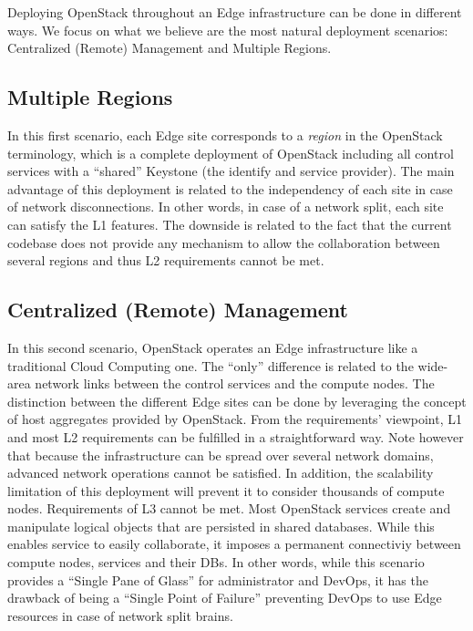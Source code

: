 Deploying OpenStack throughout an Edge infrastructure can be done in different ways. We focus on what we believe are the most natural deployment scenarios: Centralized (Remote) Management and Multiple Regions. 


\subsection{Multiple Regions}
In this first scenario, each Edge site corresponds to a \emph{region}
in the OpenStack terminology, which is a complete deployment of
OpenStack including all control services with a ``shared'' Keystone
(\ie the identify and service provider). The main advantage of this
deployment is related to the independency of each site in case of
network disconnections. In other words, in case of a network split,
each site can satisfy the L1 features. The downside is related to the
fact that the current codebase does not provide any mechanism to allow
the collaboration between several regions and thus L2 requirements
cannot be met.

\subsection{Centralized (Remote) Management}
\label{subsec:centralized_os}
In this second scenario, OpenStack operates an Edge infrastructure
like a traditional Cloud Computing one. The ``only'' difference is
related to the wide-area network links between the control services
and the compute nodes. The distinction between the different Edge
sites can be done by leveraging the concept of host aggregates
provided by OpenStack.
%
From the requirements' viewpoint, L1 and most L2 requirements can be
fulfilled in a straightforward way. Note however that because the
infrastructure can be spread over several network domains, advanced
network operations cannot be satisfied. In addition, the scalability
limitation of this deployment will prevent it to consider thousands of
compute nodes.
%
Requirements of L3 cannot be met. Most OpenStack services create and
manipulate logical objects that are persisted in shared databases.
While this enables service to easily collaborate, it imposes a
permanent connectiviy between compute nodes, services and their DBs.
In other words, while this scenario provides a ``Single Pane of
Glass'' for administrator and DevOps, it has the drawback of being a
``Single Point of Failure'' preventing DevOps to use Edge resources in
case of network split brains.


